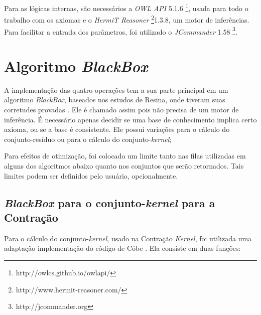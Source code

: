 Para as lógicas internas, são necessários a \textit{OWL API} 5.1.6 \footnote{http://owlcs.github.io/owlapi/}, usada para todo o trabalho com os axiomas e o \textit{HermiT Reasoner} \footnote{http://www.hermit-reasoner.com/}1.3.8, um motor de inferências. Para facilitar a entrada dos parâmetros, foi utilizado o \textit{JCommander} 1.58 \footnote{http://jcommander.org}.

\section{Algoritmo \textit{BlackBox}}

A implementação das quatro operações tem a sua parte principal em um algoritmo \textit{BlackBox}, baseados nos estudos de Resina, onde tiveram suas corretudes provadas \citep{logicaResina}. Ele é chamado assim pois não precisa de um motor de inferência. É necessário apenas decidir se uma base de conhecimento implica certo axioma, ou se a base é consistente. Ele possui variações para o cálculo do conjunto-resíduo ou para o cálculo do conjunto-\textit{kernel};

Para efeitos de otimização, foi colocado um limite tanto nas filas utilizadas em alguns dos algoritmos abaixo quanto nos conjuntos que serão retornados. Tais limites podem ser definidos pelo usuário, opcionalmente.

\subsection{\textit{BlackBox} para o conjunto-\textit{kernel} para a Contração}

Para o cálculo do conjunto-\textit{kernel}, usado na Contração \textit{Kernel}, foi utilizada uma adaptação implementação do código de Cóbe \citep{logicaMatos}. Ela consiste em duas funções:

